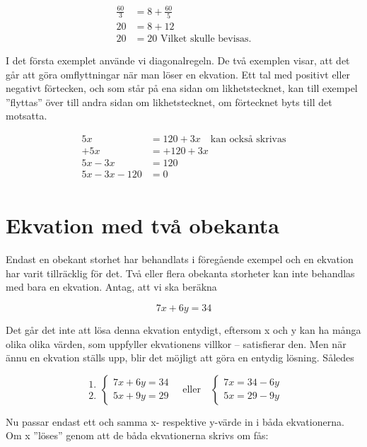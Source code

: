\begin{align*}
\frac{60}{3} & = 8 + \frac{60}{5}\\
          20 &= 8 + 12 \\
          20 &= 20\text{ Vilket skulle bevisas.}
\end{align*}

I det första exemplet använde vi diagonalregeln.
De två exemplen visar, att det går att göra omflyttningar när man löser en
ekvation.
Ett tal med positivt eller negativt förtecken, och som står på ena sidan om
likhetstecknet, kan till exempel ''flyttas'' över till andra sidan om likhetstecknet,
om förtecknet byts till det motsatta.

\begin{align*}
  5x &= 120 + 3x \quad \text{kan också skrivas} \\
  +5x &= +120+ 3x \\
  5x-3x &= 120 \\
  5x- 3x-120 &= 0 \\
\end{align*}

\section{Ekvation med två obekanta}

Endast en obekant storhet har behandlats i föregående exempel och en ekvation
har varit tillräcklig för det.
Två eller flera obekanta storheter kan inte behandlas med bara en ekvation.
Antag, att vi ska beräkna

\[7x+6y=34\]

Det går det inte att lösa denna ekvation entydigt, eftersom x och y kan ha många
olika olika värden, som uppfyller ekvationens villkor -- satisfierar den.
Men när ännu en ekvation ställs upp, blir det möjligt att göra en entydig
lösning.
Således

\[
\begin{array}{c}
1.\\2.
\end{array}
\left\{
\begin{array}{l}
7x + 6y = 34\\
5x + 9y = 29
\end{array}
\right.
\quad \text{eller} \quad
\left\{
\begin{array}{l}
7x = 34 - 6y\\
5x = 29 - 9y 
\end{array}
\right. 
\]

Nu passar endast ett och samma x- respektive y-värde in i båda ekvationerna.
Om x ''löses'' genom att de båda ekvationerna skrivs om fås:

